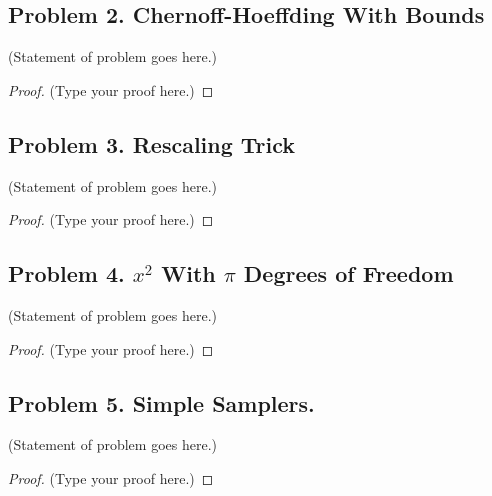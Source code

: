 \documentclass[12pt]{article}
\begin{document}
	\vspace{2in} %
	
	
	\subsection*{Problem 2. Chernoff-Hoeffding With Bounds}
	(Statement of problem goes here.)\\
	
	\begin{proof}
		(Type your proof here.)
	\end{proof}
	
	\vspace{2in} %
	
	
	\subsection*{Problem 3. Rescaling Trick}
	(Statement of problem goes here.)\\
	
	\begin{proof}
		(Type your proof here.)
	\end{proof}
	
	\vspace{2in} %
	
	
	
	\subsection*{Problem 4. $x^2$ With $\pi$ Degrees of Freedom}
	(Statement of problem goes here.)\\
	
	\begin{proof}
		(Type your proof here.)
	\end{proof}
	
	\vspace{2in} %
	
	
	\subsection*{Problem 5. Simple Samplers.}
	(Statement of problem goes here.)\\
	
	\begin{proof}
		(Type your proof here.)
	\end{proof}
	
	\vspace{2in} %
	
\end{document}
